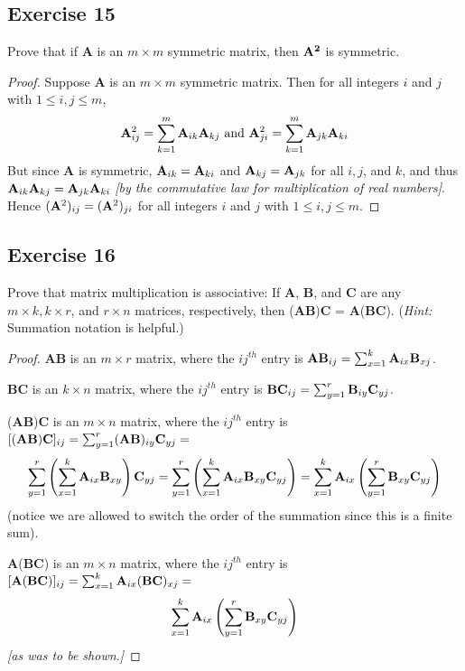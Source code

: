 \documentclass[14pt]{extarticle}
\begin{document}
\subsection{Exercise 15}
Prove that if {\bf A} is an \(m \times m\) symmetric matrix, then \({\bf A^2}\) is symmetric.

\begin{proof}
Suppose {\bf A} is an \(m \times m\) symmetric matrix. Then for all integers \(i\) and \(j\) with \(1 \leq i, j \leq m\),
\[
{\bf A}^2_{ij} = \sum_{k=1}^{m} {\bf A}_{ik} {\bf A}_{kj} \text{ and } {\bf A}^2_{ji} = \sum_{k=1}^{m} {\bf A}_{jk} {\bf A}_{ki}
\]
But since {\bf A} is symmetric, \({\bf A}_{ik} = {\bf A}_{ki}\) and \({\bf A}_{kj} = {\bf A}_{jk}\) for all \(i, j\), and \(k\), and thus \({\bf A}_{ik}
{\bf A}_{kj} = {\bf A}_{jk} {\bf A}_{ki}\) {\it [by the commutative law for multiplication of real numbers]}. Hence \(({\bf A}^2)_{ij} = 
({\bf A}^2)_{ji}\) for all integers \(i\) and \(j\) with \(1 \leq i, j \leq m\).
\end{proof}

\subsection{Exercise 16}
Prove that matrix multiplication is associative: If {\bf A}, {\bf B}, and {\bf C} are any \(m \times k, k \times r\), and 
\(r \times n\) matrices, respectively, then ({\bf A}{\bf B}){\bf C} = {\bf A}({\bf B}{\bf C}). 
({\it Hint:} Summation notation is helpful.)

\begin{proof}
{\bf A}{\bf B} is an \(m \times r\) matrix, where the \(ij^{th}\) entry is \({\bf A}{\bf B}_{ij} = \sum_{x=1}^{k}{\bf A}_{ix}{\bf B}_{xj}\).

{\bf B}{\bf C} is an \(k \times n\) matrix, where the \(ij^{th}\) entry is \({\bf B}{\bf C}_{ij} = \sum_{y=1}^{r}{\bf B}_{iy}{\bf C}_{yj}\).

({\bf A}{\bf B}){\bf C} is an \(m \times n\) matrix, where the \(ij^{th}\) entry is \([({\bf A}{\bf B}){\bf C}]_{ij} = 
\sum_{y=1}^{r} ({\bf A}{\bf B})_{iy}{\bf C}_{yj} = \)
\[
\sum_{y=1}^{r} \left(\sum_{x=1}^{k}{\bf A}_{ix}{\bf B}_{xy}\right) {\bf C}_{yj} 
= \sum_{y=1}^{r}\left(\sum_{x=1}^{k}{\bf A}_{ix}{\bf B}_{xy} {\bf C}_{yj}\right)
= \sum_{x=1}^{k}{\bf A}_{ix}\left(\sum_{y=1}^{r}{\bf B}_{xy} {\bf C}_{yj}\right)
\]
(notice we are allowed to switch the order of the summation since this is a finite sum).

{{\bf A}({\bf B}{\bf C})} is an \(m \times n\) matrix, where the \(ij^{th}\) entry is \([{\bf A}({\bf B}{\bf C})]_{ij} = 
\sum_{x=1}^{k} {\bf A}_{ix}({\bf B}{\bf C})_{xj}= \)
\[
\sum_{x=1}^{k}{\bf A}_{ix}\left(\sum_{y=1}^{r}{\bf B}_{xy}{\bf C}_{yj}\right)
\]
{\it [as was to be shown.]}
\end{proof}
\end{document}
